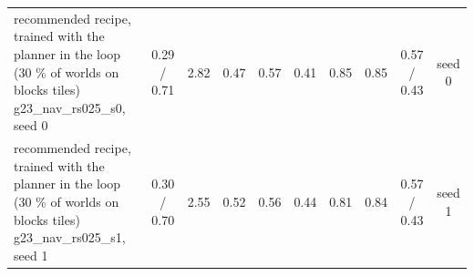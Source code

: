 \begin{table}[t]
{\begin{tabular}{lccccccccc}
recommended recipe, trained with the planner in the loop (30 \% of worlds on blocks tiles) g23\_nav\_rs025\_s0, seed 0 & 0.29 / 0.71 & 2.82 & 0.47 & 0.57 & 0.41 & 0.85 & 0.85 & 0.57 / 0.43 & seed 0\\
recommended recipe, trained with the planner in the loop (30 \% of worlds on blocks tiles) g23\_nav\_rs025\_s1, seed 1 & 0.30 / 0.70 & 2.55 & 0.52 & 0.56 & 0.44 & 0.81 & 0.84 & 0.57 / 0.43 & seed 1\\
\bottomrule\end{tabular}}
\end{table}
